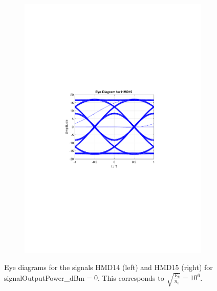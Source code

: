 \begin{figure}
\begin{subfigure}{.5\textwidth}
		\includegraphics[clip, trim=5cm 10cm 5cm 10cm, width=\textwidth]{./sdf/m_qam_system/figures/HMD15_eye_diagram_0.pdf}
	\end{subfigure}
	\caption{Eye diagrams for the signals HMD14 (left) and HMD15 (right) for signalOutputPower\_dBm$=0$. This corresponds to $\sqrt{\frac{E_b}{n_0}}=10^{6}$.}
	\label{fig:eye_diagram_0}
\end{figure}

